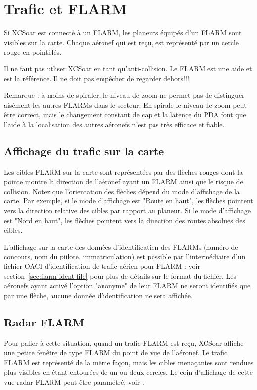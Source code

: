 \section{Trafic et FLARM}

Si XCSoar est connecté à un FLARM, les planeurs équipés d'un FLARM sont visibles sur la carte. Chaque aéronef qui est reçu, est représenté par un cercle rouge en pointillés.

\warning Il ne faut pas utliser XCSoar en tant qu'anti-collision. Le FLARM est une aide et est la référence. Il ne doit pas empêcher de regarder dehors!!!

Remarque : à moins de spiraler, le niveau de zoom ne permet pas de distinguer aisément les autres FLARMs dans le secteur. En spirale le niveau de zoom peut-être correct, mais le changement constant de cap et la latence du PDA font que l'aide à la localisation des autres aéronefs n'est pas très efficace et fiable.

\subsection*{Affichage du trafic sur la carte}

Les cibles FLARM sur la carte sont représentées par des flèches rouges dont la pointe montre la direction de l'aéronef ayant un FLARM ainsi que le risque de collision. Notez que l'orientation des flèches dépend du mode d'affichage de la carte. Par exemple, si le mode d'affichage est "Route en haut", les flèches pointent vers la direction relative des cibles par rapport au planeur. Si le mode d'affichage est "Nord en haut", les flèches pointent vers la direction des routes absolues des cibles.

L'affichage sur la carte des données d'identification des FLARMs (numéro de concours, nom du piilote, immatriculation) est possible par l'intermédiaire d'un fichier OACI d'identification de trafic aérien pour FLARM : voir section~\ref{sec:flarm-ident-file} pour plus de détails sur le format du fichier. Les aéronefs ayant activé l'option "anonyme" de leur FLARM ne seront identifiés que par une flèche, aucune donnée d'identification ne sera affichée.

\subsection*{Radar FLARM}

Pour palier à cette situation, quand un trafic FLARM est reçu, XCSoar affiche une petite fenêtre de type FLARM du point de vue de l'aéronef. Le trafic FLARM est représenté de la même façon, mais les cibles menaçantes sont rendues plus visibles en étant entourées de un ou deux cercles. Le coin d'affichage de cette vue radar FLARM peut-être paramétré, voir .

